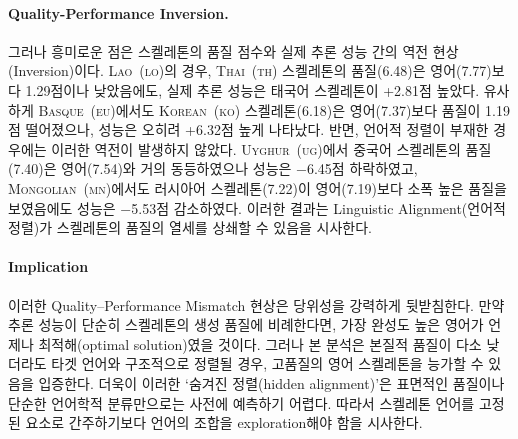 \paragraph{Quality-Performance Inversion.} 
그러나 흥미로운 점은 스켈레톤의 품질 점수와 실제 추론 성능 간의 역전 현상(Inversion)이다. \textsc{Lao~(lo)}의 경우, \textsc{Thai~(th)} 스켈레톤의 품질(6.48)은 영어(7.77)보다 1.29점이나 낮았음에도, 실제 추론 성능은 태국어 스켈레톤이 +2.81점 높았다. 유사하게 \textsc{Basque~(eu)}에서도 \textsc{Korean~(ko)} 스켈레톤(6.18)은 영어(7.37)보다 품질이 1.19점 떨어졌으나, 성능은 오히려 +6.32점 높게 나타났다. 반면, 언어적 정렬이 부재한 경우에는 이러한 역전이 발생하지 않았다. \textsc{Uyghur~(ug)}에서 중국어 스켈레톤의 품질(7.40)은 영어(7.54)와 거의 동등하였으나 성능은 −6.45점 하락하였고, \textsc{Mongolian~(mn)}에서도 러시아어 스켈레톤(7.22)이 영어(7.19)보다 소폭 높은 품질을 보였음에도 성능은 −5.53점 감소하였다. 이러한 결과는 Linguistic Alignment(언어적 정렬)가 스켈레톤의 품질의 열세를 상쇄할 수 있음을 시사한다.

\paragraph{Implication}
이러한 Quality--Performance Mismatch 현상은  당위성을 강력하게 뒷받침한다. 만약 추론 성능이 단순히 스켈레톤의 생성 품질에 비례한다면, 가장 완성도 높은 영어가 언제나 최적해(optimal solution)였을 것이다. 그러나 본 분석은 본질적 품질이 다소 낮더라도 타겟 언어와 구조적으로 정렬될 경우, 고품질의 영어 스켈레톤을 능가할 수 있음을 입증한다. 더욱이 이러한 `숨겨진 정렬(hidden alignment)'은 표면적인 품질이나 단순한 언어학적 분류만으로는 사전에 예측하기 어렵다. 따라서 스켈레톤 언어를 고정된 요소로 간주하기보다 언어의 조합을 exploration해야 함을 시사한다.

